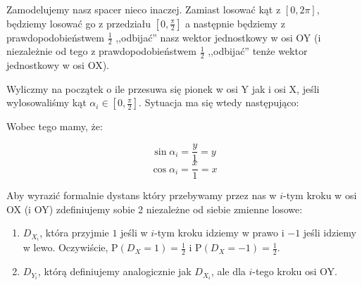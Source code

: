 Zamodelujemy nasz spacer nieco inaczej. Zamiast losować kąt z \([0, 2\pi]\), będziemy losować go z przedziału \( [0, \frac{\pi}{2}]\) a następnie będziemy z prawdopodobieństwem \(\frac{1}{2}\) ,,odbijać'' nasz wektor jednostkowy w osi OY (i niezależnie od tego z prawdopodobieństwem \(\frac{1}{2}\) ,,odbijać'' tenże wektor jednostkowy w osi OX). 

Wyliczmy na początek o ile przesuwa się pionek w osi Y jak i osi X, jeśli wylosowaliśmy kąt \( \alpha_i \in [0, \frac{\pi}{2}] \). Sytuacja ma się wtedy następująco: 

\begin{center}

\end{center}

Wobec tego mamy, że:

\[ 
    \sin{\alpha_i} = \frac{y}{1} = y
\]
\[
    \cos{\alpha_i} = \frac{x}{1} = x
\]

Aby wyrazić formalnie dystans który przebywamy przez nas w \(i\)-tym kroku w osi OX (i OY) zdefiniujemy sobie 2 niezależne od siebie zmienne losowe:

\begin{enumerate}
    \item \(D_{X_i}\), która przyjmie \(1\) jeśli w \(i\)-tym kroku idziemy w prawo i \(-1\) jeśli idziemy w lewo. Oczywiście, \( \mathrm{P}(D_X = 1) = \frac{1}{2}\) i \(\mathrm{P}(D_X = -1) = \frac{1}{2}\).
    \item \(D_{Y_i}\), którą definiujemy analogicznie jak \(D_{X_i}\), ale dla \(i\)-tego kroku osi OY.
\end{enumerate}

